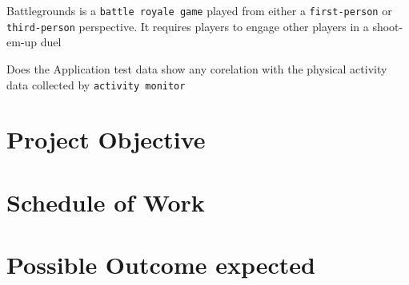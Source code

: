 \documentclass{report}
\begin{document}
    Battlegrounds is a {\tt battle royale game} played from either a {\tt first-person} or {\tt third-person} perspective. 
    It requires players to engage other players in a shoot-em-up duel

    Does the Application test data show any corelation with the physical activity data collected by {\tt activity monitor}
    
    \section{Project Objective}
    \section{Schedule of Work}
    \section{Possible Outcome expected}
\end{document}

